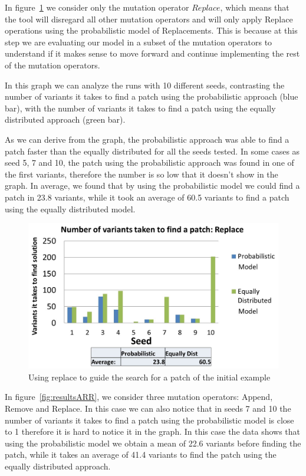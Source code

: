 \documentclass[conference]{IEEEtran}
\begin{document}
In figure~\ref{fig:resultsReplace} we consider only the mutation operator 
$Replace$, which means that the tool will disregard all other mutation 
operators and will only apply Replace operations using the probabilistic model 
of Replacements. This is because at this step we are evaluating our model in a 
subset of the mutation operators to understand if it makes sense to move forward and 
continue implementing the rest of the mutation operators.

In this graph we can analyze the runs with 10 different seeds, contrasting the 
number of variants it takes to find a patch using the probabilistic approach 
(blue bar), with the number of variants it takes to find a patch using the 
equally distributed approach (green bar). 

As we can derive from the graph, the probabilistic approach was able to find a 
patch faster than the equally distributed for all the seeds tested. In some 
cases as seed 5, 7 and 10, the patch using the probabilistic approach was found 
in one of the first variants, therefore the number is so low that it doesn't 
show in the graph. In average, we found that by using the probabilistic model we 
could find a patch in 23.8 variants, while it took an average of 60.5 variants 
to find a patch using the equally distributed model.

\begin{figure}[!h]
  \centering
    \includegraphics[scale=0.25]{sanity3}
  \caption{Using replace to guide the search for a patch of the initial example}
  \label{fig:resultsReplace}
\end{figure}

In figure~\ref{fig:resultsARR}, we consider three mutation operators: Append, 
Remove and Replace. In this case we can also notice that in seeds 7 and 10 the 
number of variants it takes to find a patch using the probabilistic model is 
close to 1 therefore it is hard to notice it in the graph. In this case the data 
shows that using the probabilistic model we obtain a mean of 22.6 variants 
before finding the patch, while it takes an average of 41.4 variants to find the 
patch using the equally distributed approach.
\end{document}
